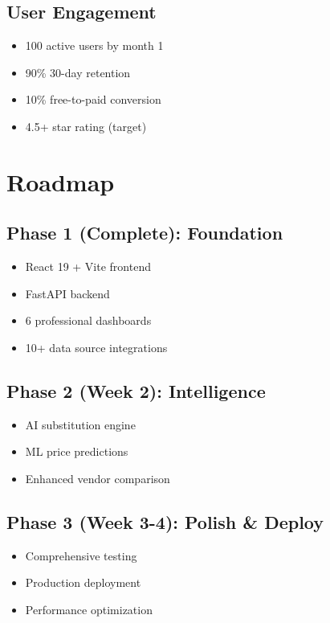 \documentclass[11pt,a4paper]{article}
\begin{document}
\subsection{User Engagement}
\begin{itemize}
    \item 100 active users by month 1
    \item 90\% 30-day retention
    \item 10\% free-to-paid conversion
    \item 4.5+ star rating (target)
\end{itemize}

\section{Roadmap}

\subsection{Phase 1 (Complete): Foundation}
\begin{itemize}
    \item[✓] React 19 + Vite frontend
    \item[✓] FastAPI backend
    \item[✓] 6 professional dashboards
    \item[✓] 10+ data source integrations
\end{itemize}

\subsection{Phase 2 (Week 2): Intelligence}
\begin{itemize}
    \item AI substitution engine
    \item ML price predictions
    \item Enhanced vendor comparison
\end{itemize}

\subsection{Phase 3 (Week 3-4): Polish \& Deploy}
\begin{itemize}
    \item Comprehensive testing
    \item Production deployment
    \item Performance optimization
\end{itemize}
\end{document}
